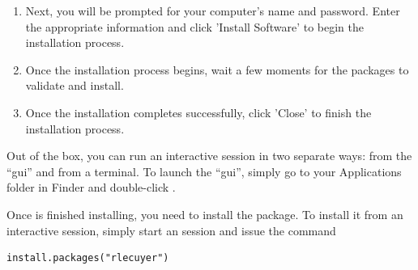 \begin{enumerate}
  \item Next, you will be prompted for your computer's name and password.  Enter the appropriate information and click 'Install Software' to begin the installation process.
  \item Once the installation process begins, wait a few moments for the packages to validate and install.
  \item Once the installation completes successfully, click 'Close' to finish the installation process.
\end{enumerate}

Out of the box, you can run an interactive  session in two separate ways:  from the ``gui'' and from a terminal.  To launch the  ``gui'', simply go to your Applications folder in Finder and double-click .

Once  is finished installing, you need to install the  \href{http://cran.r-project.org/web/packages/rlecuyer/index.html}{} package.  To install it from an interactive  session, simply start an  session and issue the command
\begin{lstlisting}[language=rr]
install.packages("rlecuyer")
\end{lstlisting}





